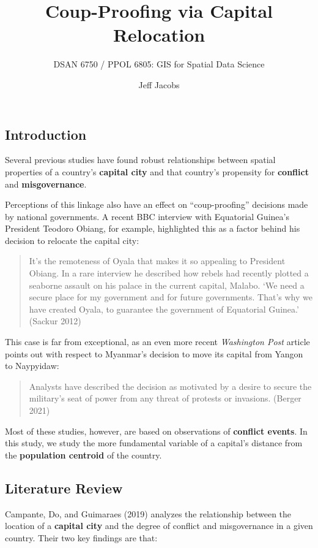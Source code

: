 \documentclass[
  letterpaper,
  DIV=11,
  numbers=noendperiod]{scrartcl}
\title{Coup-Proofing via Capital Relocation}
\subtitle{DSAN 6750 / PPOL 6805: GIS for Spatial Data Science}
\author{Jeff Jacobs}
\date{}
\begin{document}
\maketitle


\subsection{Introduction}\label{introduction}

Several previous studies have found robust relationships between spatial
properties of a country's \textbf{capital city} and that country's
propensity for \textbf{conflict} and \textbf{misgovernance}.

Perceptions of this linkage also have an effect on ``coup-proofing''
decisions made by national governments. A recent BBC interview with
Equatorial Guinea's President Teodoro Obiang, for example, highlighted
this as a factor behind his decision to relocate the capital city:

\begin{quote}
It's the remoteness of Oyala that makes it so appealing to President
Obiang. In a rare interview he described how rebels had recently plotted
a seaborne assault on his palace in the current capital, Malabo. `We
need a secure place for my government and for future governments. That's
why we have created Oyala, to guarantee the government of Equatorial
Guinea.' (Sackur 2012)
\end{quote}

This case is far from exceptional, as an even more recent
\emph{Washington Post} article points out with respect to Myanmar's
decision to move its capital from Yangon to Naypyidaw:

\begin{quote}
Analysts have described the decision as motivated by a desire to secure
the military's seat of power from any threat of protests or invasions.
(Berger 2021)
\end{quote}

Most of these studies, however, are based on observations of
\textbf{conflict events}. In this study, we study the more fundamental
variable of a capital's distance from the \textbf{population centroid}
of the country.

\subsection{Literature Review}\label{literature-review}

Campante, Do, and Guimaraes (2019) analyzes the relationship between the
location of a \textbf{capital city} and the degree of conflict and
misgovernance in a given country. Their two key findings are that:
\end{document}
